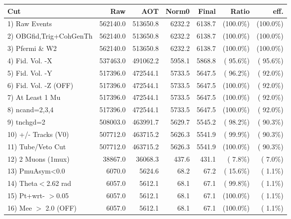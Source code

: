  \begin{table}[h!]\centering
 \begin{tabular}{||l||r|r|r|r|r|r||}
 \hline
 \hline
 Cut & Raw & AOT & Norm0 & Final & Ratio & eff.       \\
 \hline
  1) Raw Events           &     562140.0 &     513650.8 &       6232.2 &       6138.7 & (100.0\%) & (100.0\%) \\
  2) OBGfid,Trig+CohGenTh &     562140.0 &     513650.8 &       6232.2 &       6138.7 & (100.0\%) & (100.0\%) \\
  3) Pfermi \& W2         &     562140.0 &     513650.8 &       6232.2 &       6138.7 & (100.0\%) & (100.0\%) \\
  4) Fid. Vol. -X         &     537463.0 &     491062.2 &       5958.1 &       5868.8 & ( 95.6\%) & ( 95.6\%) \\
  5) Fid. Vol. -Y         &     517396.0 &     472544.1 &       5733.5 &       5647.5 & ( 96.2\%) & ( 92.0\%) \\
  6) Fid. Vol. -Z (OFF)   &     517396.0 &     472544.1 &       5733.5 &       5647.5 & (100.0\%) & ( 92.0\%) \\
  7) At Least 1 Mu        &     517396.0 &     472544.1 &       5733.5 &       5647.5 & (100.0\%) & ( 92.0\%) \\
  8) ncand=2,3,4          &     517396.0 &     472544.1 &       5733.5 &       5647.5 & (100.0\%) & ( 92.0\%) \\
  9) tnchgd=2             &     508003.0 &     463991.7 &       5629.7 &       5545.2 & ( 98.2\%) & ( 90.3\%) \\
 10) +/- Tracks (V0)      &     507712.0 &     463715.2 &       5626.3 &       5541.9 & ( 99.9\%) & ( 90.3\%) \\
 11) Tube/Veto Cut        &     507712.0 &     463715.2 &       5626.3 &       5541.9 & (100.0\%) & ( 90.3\%) \\
 12) 2 Muons (1mux)       &      38867.0 &      36068.3 &        437.6 &        431.1 & (  7.8\%) & (  7.0\%) \\
 13) PmuAsym<0.0          &       6070.0 &       5624.6 &         68.2 &         67.2 & ( 15.6\%) & (  1.1\%) \\
 14) Theta$<$2.62 rad     &       6057.0 &       5612.1 &         68.1 &         67.1 & ( 99.8\%) & (  1.1\%) \\
 15) Pt+wrt- $>$0.05      &       6057.0 &       5612.1 &         68.1 &         67.1 & (100.0\%) & (  1.1\%) \\
 16) Mee $>$ 2.0  (OFF)   &       6057.0 &       5612.1 &         68.1 &         67.1 & (100.0\%) & (  1.1\%) \\

\end{tabular}
\end{table}
